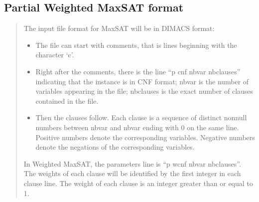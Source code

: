 \documentclass[letterpaper,10pt,openany,oneside,english]{sphinxmanual}
\begin{document}
\subsection{Partial Weighted MaxSAT format}
\label{\detokenize{formats/cnfwcnfformat:partial-weighted-maxsat-format}}\label{\detokenize{formats/cnfwcnfformat:cnfwcnf-format}}\label{\detokenize{formats/cnfwcnfformat::doc}}\begin{quote}

\sphinxAtStartPar
{}

\sphinxAtStartPar
The input file format for Max\sphinxhyphen{}SAT will be in DIMACS format:

\begin{sphinxVerbatim}[commandchars=\\\{\}]
  
   
  
   
  
  
\end{sphinxVerbatim}
\begin{itemize}
\item {} 
\sphinxAtStartPar
The file can start with comments, that is lines beginning with the character ‘c’.

\item {} 
\sphinxAtStartPar
Right after the comments, there is the line “p cnf nbvar nbclauses” indicating that the instance is in CNF format; nbvar is the number of variables appearing in the file; nbclauses is the exact number of clauses contained in the file.

\item {} 
\sphinxAtStartPar
Then the clauses follow. Each clause is a sequence of distinct non\sphinxhyphen{}null numbers between \sphinxhyphen{}nbvar and nbvar ending with 0 on the same line. Positive numbers denote the corresponding variables. Negative numbers denote the negations of the corresponding variables.

\end{itemize}

\sphinxAtStartPar
{}

\sphinxAtStartPar
In Weighted Max\sphinxhyphen{}SAT, the parameters line is “p wcnf nbvar nbclauses”. The weights of each clause will be identified by the first integer in each clause line. The weight of each clause is an integer greater than or equal to 1.


\end{quote}
\end{document}
